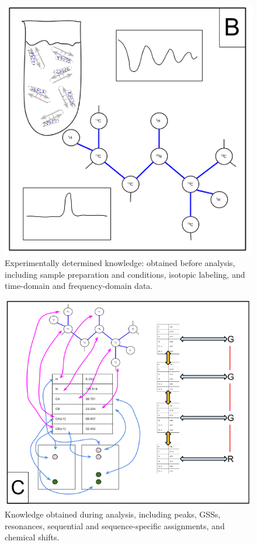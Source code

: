 \begin{figure}
  \includegraphics[scale=0.7]{figures/data_overview_2}
  \caption[Experimentally determined knowledge: obtained before analysis.]
          {Experimentally determined knowledge: obtained before analysis,
           including sample preparation and conditions, isotopic labeling,
           and time-domain and frequency-domain data.}
  \label{data_overview_2}
\end{figure}

\begin{figure}
  \includegraphics[scale=0.6]{figures/data_overview_3}
  \caption[Knowledge obtained during analysis.]
          {Knowledge obtained during analysis, including peaks, GSSs,
           resonances, sequential and sequence-specific assignments, and
           chemical shifts.}
  \label{data_overview_3}
\end{figure}


